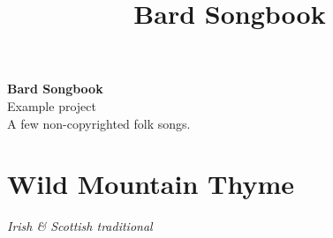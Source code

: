\documentclass[12pt,a5paper,openany]{memoir}
\title{\I Bard Songbook}
\newcommand\I[0]{%
  \ignorespaces
}
\newcommand\songtitle[1]{%
  \FloatBlock
  \vfil
  \pagebreak[2]
  \vfilneg
  \section{#1}
}
\newcommand\subtitle[1]{%
  \emph{#1}
}
\begin{document}
\frontmatter
\begin{titlingpage}
  \begin{vplace}[0.5]
    \begin{center}
      \Huge{\textbf{\I Bard Songbook}} \\
      \vspace{0.5cm}
      \LARGE{\I Example project} \\
      \vspace{10cm}
      \small{\I A few non-copyrighted folk songs.}
    \end{center}
  \end{vplace}
\end{titlingpage}

\tableofcontents*

\mainmatter
\pagestyle{songs}
\songtitle{\I Wild Mountain Thyme}

  
    \begin{center}
    \subtitle{\I Irish \& Scottish traditional}
    
    \end{center}
  
\end{document}
